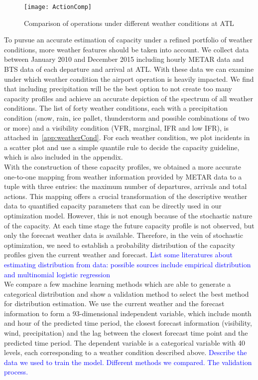 \documentclass[12pt]{article}
\begin{document}
	\begin{figure}[H]
		\centering
		\texttt{[image: ActionComp]}
		\caption{Comparison of operations under different weather conditions at ATL}
		\label{fig:actionComp}
	\end{figure}
	\noindent To pursue an accurate estimation of capacity under a refined portfolio of weather conditions, more weather features should be taken into account. We collect data between January 2010 and December 2015 including hourly METAR data and BTS data of each departure and arrival at ATL. With these data we can examine under which weather condition the airport operation is heavily impacted. We find that including precipitation will be the best option to not create too many capacity profiles and achieve an accurate depiction of the spectrum of all weather conditions. The list of forty weather conditions, each with a precipitation condition (snow, rain, ice pallet, thunderstorm and possible combinations of two or more) and a visibility condition (VFR, marginal, IFR and low IFR), is attached in~\ref{app:weatherCond}. For each weather condition, we plot incidents in a scatter plot and use a simple quantile rule to decide the capacity guideline, which is also included in the appendix.\\
	\newline
	With the construction of these capacity profiles, we obtained a more accurate one-to-one mapping from weather information provided by METAR data to a tuple with three entries: the maximum number of departures, arrivals and total actions. This mapping offers a crucial transformation of the descriptive weather data to quantified capacity parameters that can be directly used in our optimization model. However, this is not enough because of the stochastic nature of the capacity. At each time stage the future capacity profile is not observed, but only the forecast weather data is available. Therefore, in the vein of stochastic optimization, we need to establish a probability distribution of the capacity profiles given the current weather and forecast. \textcolor{blue}{List some literatures about estimating distribution from data: possible sources include empirical distribution and multinomial logistic regression}\\
	\newline
	We compare a few machine learning methods which are able to generate a categorical distribution and show a validation method to select the best method for distribution estimation. We use the current weather and the forecast information to form a 93-dimensional independent variable, which include month and hour of the predicted time period, the closest forecast information (visibility, wind, precipitation) and the lag between the closest forecast time point and the predicted time period. The dependent variable is a categorical variable with 40 levels, each corresponding to a weather condition described above. \textcolor{blue}{Describe the data we used to train the model. Different methods we compared. The validation process.}\\
\end{document}
